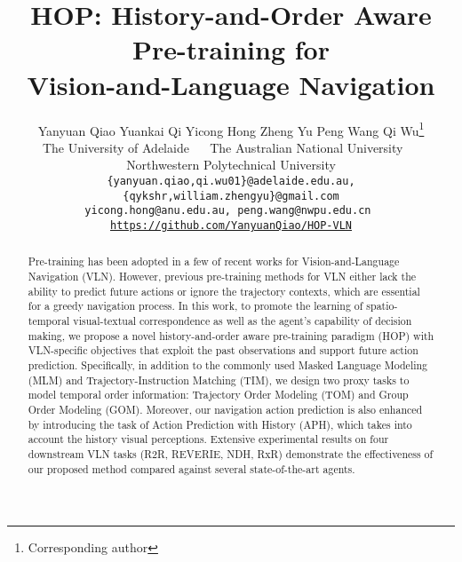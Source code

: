 \documentclass[10pt,twocolumn,letterpaper]{article}
\begin{document}
\title{HOP: History-and-Order Aware Pre-training for\\
Vision-and-Language Navigation}


\author{
Yanyuan Qiao \quad Yuankai Qi \quad Yicong Hong \quad Zheng Yu \quad Peng Wang \quad Qi Wu\thanks{Corresponding author}\\
The University of Adelaide ~~ The Australian National University ~~\\ Northwestern Polytechnical University\\
{\tt\small \{yanyuan.qiao,qi.wu01\}@adelaide.edu.au, \{qykshr,william.zhengyu\}@gmail.com} \\ 
{\tt\small yicong.hong@anu.edu.au, peng.wang@nwpu.edu.cn } \\
{\tt\small \href{https://github.com/YanyuanQiao/HOP-VLN}{https://github.com/YanyuanQiao/HOP-VLN}}
}



\maketitle

\vspace{-20pt}
\begin{abstract}
Pre-training has been adopted in a few of recent works for Vision-and-Language Navigation (VLN). However, previous pre-training methods for VLN either lack the ability to predict future actions or ignore the trajectory contexts, which are essential for a greedy navigation process. In this work, to promote the learning of spatio-temporal visual-textual correspondence as well as the agent's capability of decision making, we propose a novel history-and-order aware pre-training paradigm (HOP) with VLN-specific objectives that exploit the past observations and support future action prediction. Specifically, in addition to the commonly used Masked Language Modeling (MLM) and Trajectory-Instruction Matching (TIM), we design two proxy tasks to model temporal order information: Trajectory Order Modeling (TOM) and Group Order Modeling (GOM). Moreover, our navigation action prediction is also enhanced by introducing the task of Action Prediction with History (APH), which takes into account the history visual perceptions. Extensive experimental results on four downstream VLN tasks (R2R, REVERIE, NDH, RxR) demonstrate the effectiveness of our proposed method compared against several state-of-the-art agents.

\end{abstract}
\vspace{-20pt}
\end{document}
